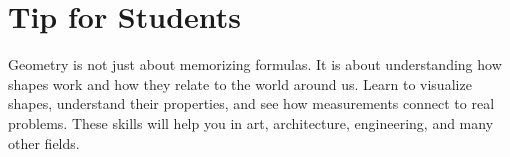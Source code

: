 \section{Tip for Students}

Geometry is not just about memorizing formulas. It is about understanding how
shapes work and how they relate to the world around us. Learn to visualize
shapes, understand their properties, and see how measurements connect to real
problems. These skills will help you in art, architecture, engineering, and many
other fields.